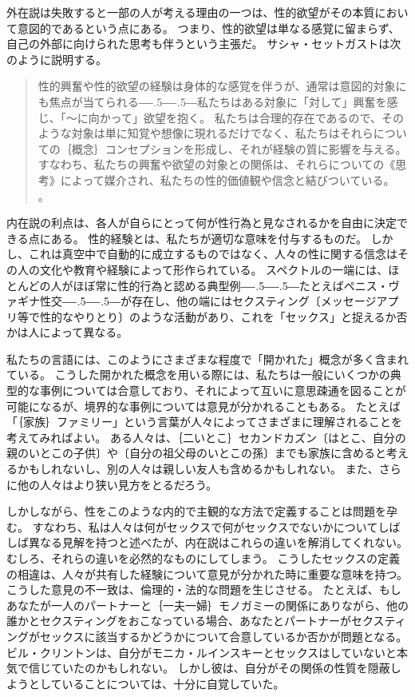 \documentclass[paper=a4,book,openany]{jlreq}
\def\DDASH{―\kern-.5\zw―\kern-.5\zw―} %
\begin{document}
外在説は失敗すると一部の人が考える理由の一つは、性的欲望がその本質において意図的であるという点にある。
つまり、性的欲望は単なる感覚に留まらず、自己の外部に向けられた思考も伴うという主張だ。
サシャ・セットガストは次のように説明する。
\begin{quote}
  性的興奮や性的欲望の経験は身体的な感覚を伴うが、通常は意図的対象にも焦点が当てられる{\DDASH}私たちはある対象に「対して」興奮を感じ、「～に向かって」欲望を抱く。
私たちは合理的存在であるので、そのような対象は単に知覚や想像に現れるだけでなく、私たちはそれらについての｛概念｝{コンセプション}を形成し、それが経験の質に影響を与える。
すなわち、私たちの興奮や欲望の対象との関係は、それらについての《思考》によって媒介され、私たちの性的価値観や信念と結びついている。  \citep[p.384, 強調は原文]{settegast18:_prost_good_sex}。
\end{quote}

内在説の利点は、各人が自らにとって何が性行為と見なされるかを自由に決定できる点にある。
性的経験とは、私たちが適切な意味を付与するものだ。
しかし、これは真空中で自動的に成立するものではなく、人々の性に関する信念はその人の文化や教育や経験によって形作られている。
スペクトルの一端には、ほとんどの人がほぼ常に性的行為と認める典型例{\DDASH}たとえばペニス・ヴァギナ性交{\DDASH}が存在し、他の端にはセクスティング〔メッセージアプリ等で性的なやりとり〕のような活動があり、これを「セックス」と捉えるか否かは人によって異なる。

私たちの言語には、このようにさまざまな程度で「開かれた」概念が多く含まれている。
こうした開かれた概念を用いる際には、私たちは一般にいくつかの典型的な事例については合意しており、それによって互いに意思疎通を図ることが可能になるが、境界的な事例については意見が分かれることもある。
たとえば「｛家族｝{ファミリー}」という言葉が人々によってさまざまに理解されることを考えてみればよい。
ある人々は、｛二いとこ｝{セカンドカズン}〔はとこ、自分の親のいとこの子供〕や〔自分の祖父母のいとこの孫〕までも家族に含めると考えるかもしれないし、別の人々は親しい友人も含めるかもしれない。
また、さらに他の人々はより狭い見方をとるだろう。

しかしながら、性をこのような内的で主観的な方法で定義することは問題を孕む。
すなわち、私は人々は何がセックスで何がセックスでないかについてしばしば異なる見解を持つと述べたが、内在説はこれらの違いを解消してくれない。
むしろ、それらの違いを必然的なものにしてしまう。
こうしたセックスの定義の相違は、人々が共有した経験について意見が分かれた時に重要な意味を持つ。
こうした意見の不一致は、倫理的・法的な問題を生じさせる。
たとえば、もしあなたが一人のパートナーと｛一夫一婦｝{モノガミー}の関係にありながら、他の誰かとセクスティングをおこなっている場合、あなたとパートナーがセクスティングがセックスに該当するかどうかについて合意しているか否かが問題となる。
ビル・クリントンは、自分がモニカ・ルインスキーとセックスはしていないと本気で信じていたのかもしれない。
しかし彼は、自分がその関係の性質を隠蔽しようとしていることについては、十分に自覚していた。
\end{document}

